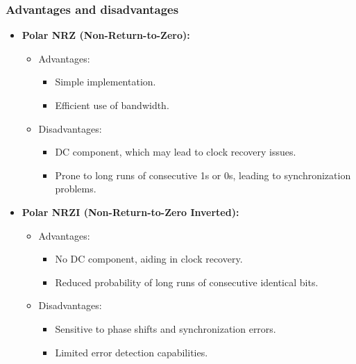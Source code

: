 \documentclass[a4paper, 12pt, english]{article}
\begin{document}
\subsubsection{Advantages and disadvantages}
\begin{itemize}
    \item \textbf{Polar NRZ (Non-Return-to-Zero):}
        \begin{itemize}
            \item Advantages:
                \begin{itemize}
                    \item Simple implementation.
                    \item Efficient use of bandwidth.
                \end{itemize}
            \item Disadvantages:
                \begin{itemize}
                    \item DC component, which may lead to clock recovery issues.
                    \item Prone to long runs of consecutive 1s or 0s, leading to synchronization problems.
                \end{itemize}
        \end{itemize}

    \item \textbf{Polar NRZI (Non-Return-to-Zero Inverted):}
        \begin{itemize}
            \item Advantages:
                \begin{itemize}
                    \item No DC component, aiding in clock recovery.
                    \item Reduced probability of long runs of consecutive identical bits.
                \end{itemize}
            \item Disadvantages:
                \begin{itemize}
                    \item Sensitive to phase shifts and synchronization errors.
                    \item Limited error detection capabilities.
                \end{itemize}
        \end{itemize}


\end{itemize}
\end{document}
